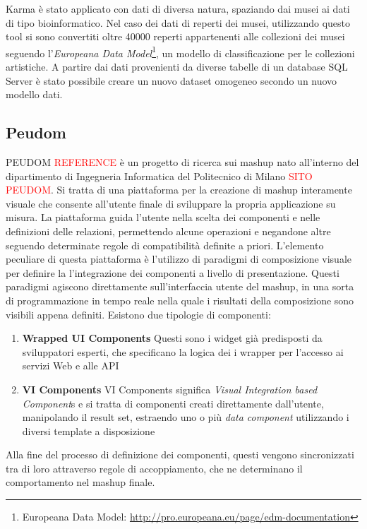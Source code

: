 Karma è stato applicato con dati di diversa natura, spaziando dai musei ai dati di tipo bioinformatico. 
Nel caso dei dati di reperti dei musei, utilizzando questo tool si sono convertiti oltre 40000 reperti appartenenti alle collezioni dei musei seguendo l'\emph{Europeana Data Model}\footnote{Europeana Data Model: \url{http://pro.europeana.eu/page/edm-documentation}}, un modello di classificazione per le collezioni artistiche. A partire dai dati provenienti da diverse tabelle di un database SQL Server è stato possibile creare un nuovo dataset omogeneo secondo un nuovo modello dati. 

\subsection*{Peudom}

PEUDOM \textcolor{red}{REFERENCE} è un progetto di ricerca sui mashup nato all'interno del dipartimento di Ingegneria Informatica del Politecnico di Milano \textcolor{red}{SITO PEUDOM}. Si tratta di una piattaforma per la creazione di mashup interamente visuale che consente all'utente finale di sviluppare la propria applicazione su misura. La piattaforma guida l'utente nella scelta dei componenti e nelle definizioni delle relazioni, permettendo alcune operazioni e negandone altre seguendo determinate regole di compatibilità definite a priori.
L'elemento peculiare di questa piattaforma è l'utilizzo di paradigmi di composizione visuale per definire la l'integrazione dei componenti a livello di presentazione. Questi paradigmi agiscono direttamente sull'interfaccia utente del mashup, in una sorta di programmazione in tempo reale nella quale i risultati della composizione sono visibili appena definiti.
Esistono due tipologie di componenti: 
\begin{enumerate}
	\item \textbf{Wrapped UI Components}
	Questi sono i widget già predisposti da sviluppatori esperti, che specificano la logica dei i wrapper per l'accesso ai servizi Web e alle API
	\item \textbf{VI Components}
	VI Components significa \emph{Visual Integration based Component}s e si tratta di componenti creati direttamente dall'utente, manipolando il result set, estraendo uno o più \emph{data component} utilizzando i diversi template a disposizione
\end{enumerate}
Alla fine del processo di definizione dei componenti, questi vengono sincronizzati tra di loro attraverso regole di accoppiamento, che ne determinano il comportamento nel mashup finale.

